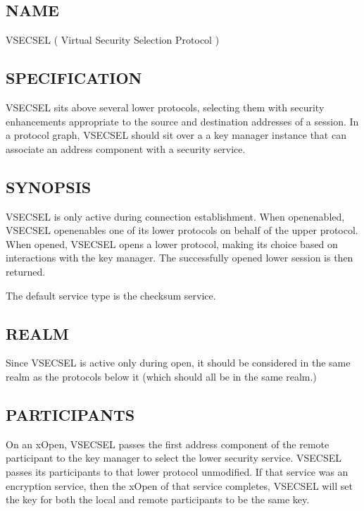 %
%

\subsection*{NAME}

\noindent VSECSEL ( Virtual Security Selection Protocol )



\subsection*{SPECIFICATION}

VSECSEL sits above several lower protocols, selecting them with
security enhancements appropriate to the source and destination
addresses of a session.  In a protocol graph, VSECSEL should sit over a
a key manager instance that can associate an address component with
a security service.


\subsection*{SYNOPSIS}

VSECSEL is only active during connection establishment.  When
openenabled, VSECSEL openenables one of its lower protocols on behalf of
the upper protocol.  When opened, VSECSEL opens a lower protocol, making
its choice based on interactions with the key manager.  The
successfully opened lower session is then returned.

The default service type is the checksum service.

\subsection*{REALM}

Since VSECSEL is active only during open, it should be considered in the
same realm as the protocols below it (which should all be in
the same realm.)

\subsection*{PARTICIPANTS}

On an xOpen, VSECSEL passes the first address component of the remote
participant to the key manager to select the lower security service.
VSECSEL passes its participants to that lower protocol unmodified.  If
that service was an encryption service, then the xOpen of that service
completes, VSECSEL will set the key for both the local and remote
participants to be the same key.

